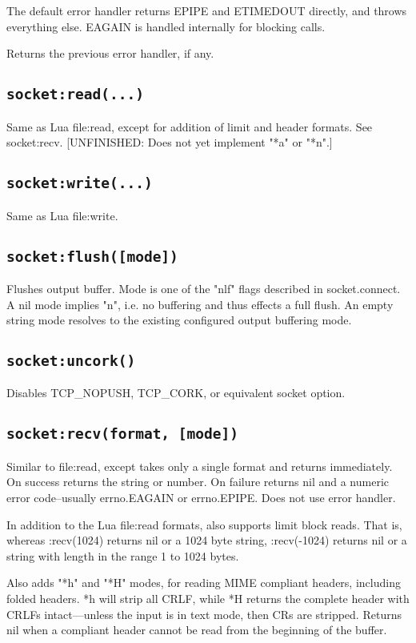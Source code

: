 \documentclass[11pt, oneside]{memoir}
\newcommand*{\fn}[1]{\texttt{#1}\xspace}
\begin{document}
	The default error handler returns EPIPE and ETIMEDOUT directly, and
	throws everything else. EAGAIN is handled internally for blocking
	calls.

	Returns the previous error handler, if any.

\subsection[\fn{socket:read}]{\fn{socket:read(...)}}
	Same as Lua file:read, except for addition of limit and header
	formats. See socket:recv. [UNFINISHED: Does not yet implement "*a"
	or "*n".]

\subsection[\fn{socket:write}]{\fn{socket:write(...)}}
	Same as Lua file:write.

\subsection[\fn{socket:flush}]{\fn{socket:flush([mode])}}
	Flushes output buffer. Mode is one of the "nlf" flags described in
	socket.connect. A nil mode implies "n", i.e. no buffering and thus
	effects a full flush. An empty string mode resolves to the existing
	configured output buffering mode.

\subsection[\fn{socket:uncork}]{\fn{socket:uncork()}}
	Disables TCP\_NOPUSH, TCP\_CORK, or equivalent socket option.

\subsection[\fn{socket:recv}]{\fn{socket:recv(format, [mode])}}
	Similar to file:read, except takes only a single format and returns
	immediately. On success returns the string or number. On failure
	returns nil and a numeric error code--usually errno.EAGAIN or
	errno.EPIPE. Does not use error handler.

	In addition to the Lua file:read formats, also supports limit block
	reads. That is, whereas :recv(1024) returns nil or a 1024 byte
	string, :recv(-1024) returns nil or a string with length in the
	range 1 to 1024 bytes.

	Also adds "*h" and "*H" modes, for reading MIME compliant headers,
	including folded headers. *h will strip all CRLF, while *H returns
	the complete header with CRLFs intact---unless the input is in text
	mode, then CRs are stripped. Returns nil when a compliant header
	cannot be read from the beginning of the buffer.
\end{document}
